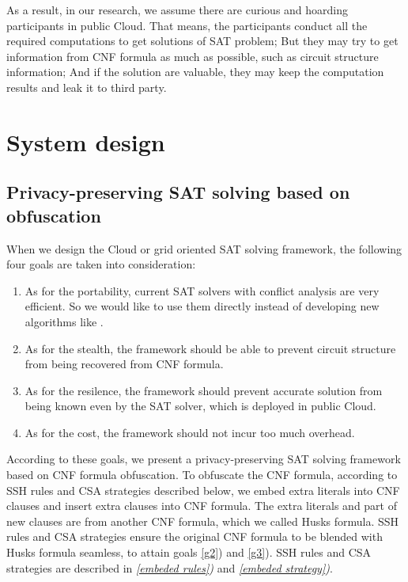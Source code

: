 \documentclass[conference]{IEEEtran}
\begin{document}
As a result,
in our research,
we assume there are
curious and hoarding participants\cite{HV-grid} in public Cloud.
That means,
the participants conduct all the required computations to get solutions of SAT problem;
But they may try to get information from CNF formula as much as possible, 
such as circuit structure information;
And if the solution are valuable, they may keep the computation results and leak it to third party.

\section{System design}

\subsection{Privacy-preserving SAT solving based on obfuscation}
When we design the Cloud or grid oriented SAT solving framework, the following four goals are taken into consideration:
\begin{enumerate}
 \item 
As for the portability, current SAT solvers with conflict analysis \cite{Minisat} are very efficient.
So we would like to use them directly 
instead of developing new algorithms like \cite{OBfuscationd-CNFs}.
 \item \label{g2}
As for the stealth\cite{obfuscationBible}, the framework should be able to prevent circuit structure from being recovered from CNF formula.
\item \label{g3}
As for the resilence\cite{obfuscationBible}, the framework should prevent accurate solution from being known even by the SAT solver, which is deployed in public Cloud.
 \item
As for the cost, the framework should not incur too much overhead.
\end{enumerate}

According to these goals,
we present a privacy-preserving SAT solving framework based on CNF formula obfuscation.
To obfuscate the CNF formula,
according to SSH rules and CSA strategies described below,
we embed extra literals into CNF clauses and insert extra clauses into CNF formula.
The extra literals and part of new clauses are from another CNF formula, which we called Husks formula.
SSH rules and CSA strategies ensure the original CNF formula to be blended with Husks formula seamless,
to attain goals  \ref{g2}) and \ref{g3}).
SSH rules and CSA strategies are described in \textit{\ref{embeded rules})} and \textit{\ref{embeded strategy})}.
\end{document}
